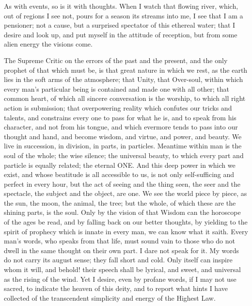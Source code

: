 \documentclass{article}
\begin{document}
As with events, so is it with thoughts. When I watch that flowing river, which, out of regions I see not, pours for a season its streams into me, I see that I am a pensioner; not a cause, but a surprised spectator of this ethereal water; that I desire and look up, and put myself in the attitude of reception, but from some alien energy the visions come.

The Supreme Critic on the errors of the past and the present, and the only prophet of that which must be, is that great nature in which we rest, as the earth lies in the soft arms of the atmosphere; that Unity, that Over-soul, within which every man's particular being is contained and made one with all other; that common heart, of which all sincere conversation is the worship, to which all right action is submission; that overpowering reality which confutes our tricks and talents, and constrains every one to pass for what he is, and to speak from his character, and not from his tongue, and which evermore tends to pass into our thought and hand, and become wisdom, and virtue, and power, and beauty. We live in succession, in division, in parts, in particles. Meantime within man is the soul of the whole; the wise silence; the universal beauty, to which every part and particle is equally related; the eternal ONE. And this deep power in which we exist, and whose beatitude is all accessible to us, is not only self-sufficing and perfect in every hour, but the act of seeing and the thing seen, the seer and the spectacle, the subject and the object, are one. We see the world piece by piece, as the sun, the moon, the animal, the tree; but the whole, of which these are the shining parts, is the soul. Only by the vision of that Wisdom can the horoscope of the ages be read, and by falling back on our better thoughts, by yielding to the spirit of prophecy which is innate in every man, we can know what it saith. Every man's words, who speaks from that life, must sound vain to those who do not dwell in the same thought on their own part. I dare not speak for it. My words do not carry its august sense; they fall short and cold. Only itself can inspire whom it will, and behold! their speech shall be lyrical, and sweet, and universal as the rising of the wind. Yet I desire, even by profane words, if I may not use sacred, to indicate the heaven of this deity, and to report what hints I have collected of the transcendent simplicity and energy of the Highest Law.
\end{document}

